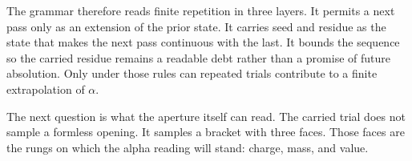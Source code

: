 The grammar therefore reads finite repetition in three layers. It permits a
next pass only as an extension of the prior state. It carries seed and residue
as the state that makes the next pass continuous with the last. It bounds the
sequence so the carried residue remains a readable debt rather than a promise
of future absolution. Only under those rules can repeated trials contribute
to a finite extrapolation of \(\alpha\).

The next question is what the aperture itself can read. The carried trial
does not sample a formless opening. It samples a bracket with three faces.
Those faces are the rungs on which the alpha reading will stand: charge,
mass, and value.
